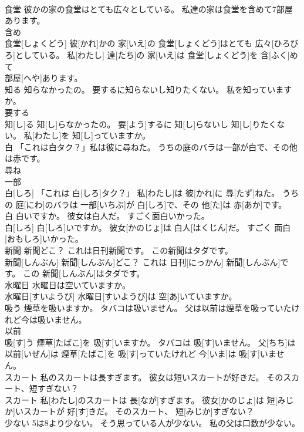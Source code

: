 \documentclass[8pt]{extreport}
\begin{document}
\begin{CJK}{UTF8}{min}
\\	食堂 彼かの家の食堂はとても広々としている。 私達の家は食堂を含めて7部屋あります。	
\\	含め 
\\	食堂[しょくどう] 彼[かれ]かの 家[いえ]の 食堂[しょくどう]はとても 広々[ひろびろ]としている。 私[わたし] 達[たち]の 家[いえ]は 食堂[しょくどう]を 含[ふく]めて 
\\	部屋[へや]あります。
\\	知る 知らなかったの。 要するに知らないし知りたくない。 私を知っていますか。	
\\	要する 
\\	知[し]る 知[し]らなかったの。 要[よう]するに 知[し]らないし 知[し]りたくない。 私[わたし]を 知[し]っていますか。
\\	白 「これは白タク？」私は彼に尋ねた。 うちの庭のバラは一部が白で、その他は赤です。	
\\	尋ね 
\\	一部 
\\	白[しろ] 「これは 白[しろ]タク？」 私[わたし]は 彼[かれ]に 尋[たず]ねた。 うちの 庭[にわ]のバラは 一部[いちぶ]が 白[しろ]で、その 他[た]は 赤[あか]です。
\\	白 白いですか。 彼女は白人だ。 すごく面白いかった。	
\\	白[しろ] 白[しろ]いですか。 彼女[かのじょ]は 白人[はくじん]だ。 すごく 面白[おもしろ]いかった。
\\	新聞 新聞どこ？ これは日刊新聞です。 この新聞はタダです。	
\\	新聞[しんぶん] 新聞[しんぶん]どこ？ これは 日刊[にっかん] 新聞[しんぶん]です。 この 新聞[しんぶん]はタダです。
\\	水曜日 水曜日は空いていますか。	
\\	水曜日[すいようび] 水曜日[すいようび]は 空[あ]いていますか。
\\	吸う 煙草を吸いますか。 タバコは吸いません。 父は以前は煙草を吸っていたけれど今は吸いません。	
\\	以前 
\\	吸[す]う 煙草[たばこ]を 吸[す]いますか。 タバコは 吸[す]いません。 父[ちち]は 以前[いぜん]は 煙草[たばこ]を 吸[す]っていたけれど 今[いま]は 吸[す]いません。
\\	スカート 私のスカートは長すぎます。 彼女は短いスカートが好きだ。 そのスカート、短すぎない？	
\\	スカート 私[わたし]のスカートは 長[なが]すぎます。 彼女[かのじょ]は 短[みじか]いスカートが 好[す]きだ。 そのスカート、 短[みじか]すぎない？
\\	少ない 5は8より少ない。 そう思っている人が少ない。 私の父は口数が少ない。	

\end{CJK}
\end{document}
